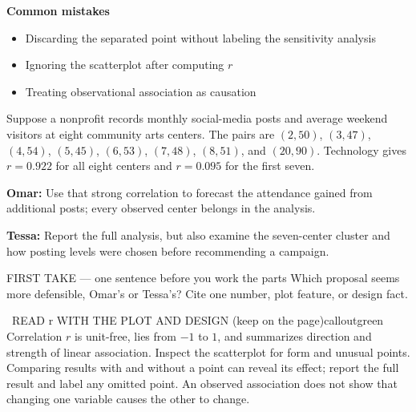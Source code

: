 \documentclass[11pt]{article}
\begin{document}
\textbf{Common mistakes}
\begin{itemize}[leftmargin=1.5em,itemsep=2pt,topsep=2pt]
  \item Discarding the separated point without labeling the sensitivity analysis
  \item Ignoring the scatterplot after computing $r$
  \item Treating observational association as causation
\end{itemize}

\clearpage
{}

Suppose a nonprofit records monthly social-media posts and average weekend visitors at eight community arts centers. The pairs are $(2,50)$, $(3,47)$, $(4,54)$, $(5,45)$, $(6,53)$, $(7,48)$, $(8,51)$, and $(20,90)$. Technology gives $r=0.922$ for all eight centers and $r=0.095$ for the first seven.\par\smallskip \textbf{Omar:} Use that strong correlation to forecast the attendance gained from additional posts; every observed center belongs in the analysis.\par \textbf{Tessa:} Report the full analysis, but also examine the seven-center cluster and how posting levels were chosen before recommending a campaign.\par
\begin{center}
\end{center}
\begin{firsttakebox}{FIRST TAKE --- one sentence before you work the parts}
Which proposal seems more defensible, Omar's or Tessa's? Cite one number, plot feature, or design fact.\par
{}
\end{firsttakebox}

\begin{callout}{\IconBook\ READ r WITH THE PLOT AND DESIGN (keep on the page)}{calloutgreen}
Correlation $r$ is unit-free, lies from $-1$ to $1$, and summarizes direction and strength of linear association. Inspect the scatterplot for form and unusual points. Comparing results with and without a point can reveal its effect; report the full result and label any omitted point. An observed association does not show that changing one variable causes the other to change.
\end{callout}
\end{document}
